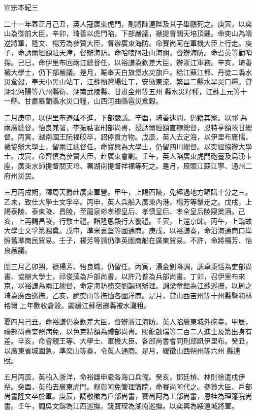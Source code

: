 
\begin{pinyinscope}
宣宗本紀三

二十一年春正月己丑，英人寇廣東虎門，副將陳連陛及其子舉鵬死之。庚寅，以奕山為御前大臣。辛卯，琦善以虎門陷，下部嚴議，褫提督關天培頂戴。命奕山為靖逆將軍，隆文、楊芳為參贊大臣，督辦廣東海防。命賽尚阿在軍機大臣上行走。庚子，命訥爾經額駐天津，督辦海防。命哈哴阿赴山海關，督辦海防。命耆英等勤哨探。己巳，命伊里布回兩江總督任，以裕謙為欽差大臣，辦浙江軍務。辛亥，琦善褫大學士，仍下部嚴議。是月，賑奉天白旗堡水災旗戶。給江蘇江都、丹徒二縣水災倉穀，奉天小黑山站丁，江蘇廟灣場灶丁，安徽東流、繁昌二縣水旱災口糧。貸湖北沔陽等八州縣衛、湖南武陵縣、甘肅金州等五州縣水災籽種，江蘇上元等十一縣、甘肅皋蘭縣水災口糧，山西河曲縣雹災倉穀。

二月庚申，以伊里布遷延不進，下部嚴議。辛酉，琦善逮問，仍籍其家。以祁為兩廣總督，怡良兼署，李振祜署刑部尚書，授訥爾經額直隸總督，恩特亨額陜甘總督。丙寅，越南國王阮福皎卒，詔停貢方物。戊辰，英人去定海，以伊里布庸懦，褫協辦大學士，留兩江總督任。命寶興為大學士，仍留四川總督。以奕經協辦大學士。戊寅，命齊慎為參贊大臣，赴廣東會剿。壬午，英人陷廣東虎門砲臺及烏湧卡座，廣東水師提督關天培、署湖南提督祥福等死之。是月，展賑江蘇江寧、通州二府州災民。

三月丙戌朔，釋周天爵赴廣東軍營。甲午，上謁西陵，免經過地方額賦十分之三。乙未，致仕大學士文孚卒。丙申，英人兵船入廣東內港，楊芳等擊走之。戊戌，上謁泰陵、泰東陵、昌陵，至龍泉峪孝穆皇后、孝慎皇后、孝全皇后陵寢奠酒。己亥，上再謁昌陵，行敷土禮。詣隆恩殿行大饗禮。壬寅，上還京師。丙午，上臨故大學士文孚第賜奠。戊申，準米裏堅等國通商。庚戌，以裕謙奏，命沿海通商口岸照舊準商民貿易。壬子，楊芳等請仍準英國商船在廣東貿易。不許，命將楊芳、怡良嚴議。

閏三月乙卯朔，褫楊芳、怡良職，仍留任。丙寅，湯金釗降調，調卓秉恬為吏部尚書、協辦大學士，祁俊藻為戶部尚書，以許乃普為兵部尚書。丁卯，召伊里布來京，以裕謙為兩江總督，命定海防務交劉韻珂辦理。調梁章鉅為江蘇巡撫，以周之琦為廣西巡撫。乙亥，諭奕山等撫恤各國洋商。是月，貸山西吉州等十州縣暨和林格爾上年歉收倉穀。蠲緩江蘇宿遷縣被水灘租。

夏四月己丑，命裕謙仍為欽差大臣，督辦浙江海防。英人陷廣東城外砲臺。甲辰，禮部尚書奎照病免，以色克精額為禮部尚書。賜龍啟瑞等二百二人進士及第出身有差。辛亥，命睿親王等、大學士、軍機大臣、各部尚書會同刑部訊伊里布。癸丑，以廣東省城圍急，準奕山等奏，令英人通商。是月，緩徵山西朔州等六州縣逋賦。

五月丙辰，英船入浙洋，命裕謙申嚴各海口兵備。癸亥，鄧廷楨、林則徐遣戍伊犁。癸酉，英船去廣東虎門。穆彰阿免管理籓院，命賽尚阿代之。參贊大臣、戶部尚書隆文卒於軍。庚辰，調敬徵為戶部尚書，賽尚阿為工部尚書，恩桂為理籓院尚書。壬午，調吳文鎔為江西巡撫，錢寶琛為湖南巡撫。以奕興為綏遠城將軍。


\end{pinyinscope}
